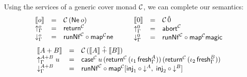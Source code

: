 \documentclass[a4paper,USenglish,cleveref, autoref]{lipics-v2019}
\begin{document}
Using the services of a generic cover monad $\C$, we can complete our semantics:
\[
\begin{array}{lcl}
  \den   \tybase & = & \C\,(\tNe\,\tybase) \\
  \upG   \tybase & = & \treturn[\C] \\
  \downG \tybase & = & \trunNf[\C] \comp \tmap[\C]\tne \\
\end{array}
\qquad
\begin{array}{lcl}
  \den   \tyzero & = & \C\,\hat0 \\
  \upG   \tyzero & = & \tabort^\C \\
  \downG \tyzero & = & \trunNf[\C] \comp \tmap[\C]\tmagic \\
\end{array}
\]
\[
\begin{array}{lcl}
  \den {A+B} & = & \C\,(\den A \hatplus \den B) \\
  \upG {A+B} \; u & = & \tcase^\C\,u
    \,(\treturn[\C]\,(\iota_1\,\tfresh^A_\Gamma))
    \,(\treturn[\C]\,(\iota_2\,\tfresh^B_\Gamma))
    \\
  \downG {A+B} & = & \trunNf[\C] \comp
    \tmap[\C] [\tinj_1 \comp \down A,\; \tinj_2 \comp \down B] \\
\end{array}
\]
\end{document}
